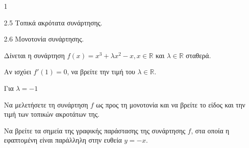 \begin{ylh}{1}
	\item 2.5 Τοπικά ακρότατα συνάρτησης.
	\item 2.6 Μονοτονία συνάρτησης.
\end{ylh}
Δίνεται η συνάρτηση $f(x) = x^3 + \lambda x^2 - x, x \in \mathbb{R}$ και $\lambda \in \mathbb{R}$ σταθερά.
\begin{alist}
	\item Αν ισχύει $f'(1) = 0$, να βρείτε την τιμή του $\lambda \in \mathbb{R}$. 

	Για $\lambda = -1$
	\item Να μελετήσετε τη συνάρτηση $f$ ως προς τη μονοτονία και να βρείτε το είδος και την τιμή των τοπικών ακροτάτων της. 
	\item Να βρείτε τα σημεία της γραφικής παράστασης της συνάρτησης $f$, στα οποία η εφαπτομένη είναι παράλληλη στην ευθεία $y = -x$. 
\end{alist}

